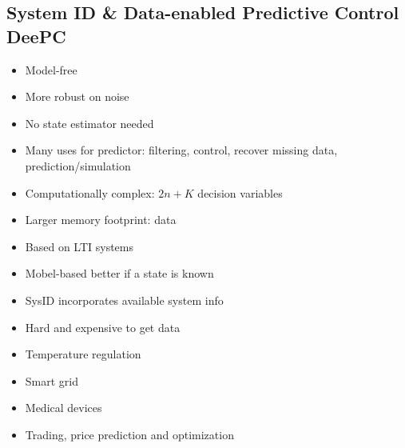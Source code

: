 \begin{mdframed}[backgroundcolor=red!20, frametitlerulewidth=0pt, innertopmargin=-2mm, innerbottommargin=2mm, skipabove=0mm]

\section{System ID \& Data-enabled Predictive Control DeePC}
\end{mdframed}
\begin{minipage}{0.33\textwidth}
    \begin{tcolorbox}[colframe=green!50!black, colback=green!5!white, title=Pros, left=0.5mm, right=0.5mm]
    \begin{itemize}[leftmargin=*]
        \item Model-free
        \item More robust on noise
        \item No state estimator needed
        \item Many uses for predictor: filtering, control, recover missing data, prediction/simulation
    \end{itemize}
    \end{tcolorbox}
\end{minipage}
\begin{minipage}{0.33\textwidth}
    \begin{tcolorbox}[colframe=red!50!black, colback=red!5!white, title=Cons, left=0.5mm, right=0.5mm]
    \begin{itemize}[leftmargin=*]
        \item Computationally complex: $2n+K$ decision variables
        \item Larger memory footprint: data
        \item Based on LTI systems
        \item Mobel-based better if a state is known
        \item SysID incorporates available system info
        \item Hard and expensive to get data
    \end{itemize}
    \end{tcolorbox}
\end{minipage}
\begin{minipage}{0.33\textwidth}
    \begin{tcolorbox}[colframe=gray!50!black, colback=gray!5!white, title=Examples, left=0.5mm, right=0.5mm]
    \begin{itemize}[leftmargin=*]
        \item Temperature regulation
        \item Smart grid
        \item Medical devices
        \item Trading, price prediction and optimization
    \end{itemize}
    \end{tcolorbox}
\end{minipage}

